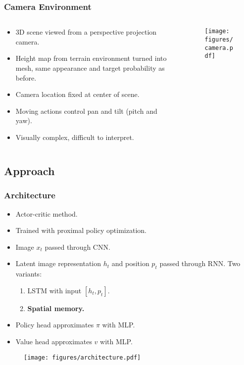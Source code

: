 \begin{frame}
    \frametitle{Camera Environment}
    \begin{columns}
        \begin{column}{0.5\textwidth}
            \begin{itemize}
                \item 3D scene viewed from a perspective projection camera.
                \item Height map from terrain environment turned into mesh, same appearance and target probability as before.
                \item Camera location fixed at center of scene.
                \item Moving actions control pan and tilt (pitch and yaw).
                \item Visually complex, difficult to interpret.
            \end{itemize}
        \end{column}
        \begin{column}{0.5\textwidth}
            \begin{figure}
                \centering
                \texttt{[image: figures/camera.pdf]}
            \end{figure}
        \end{column}
    \end{columns}
\end{frame}

\subsection{Approach}

\begin{frame}
    \frametitle{Architecture}

    \begin{itemize}
        \item Actor-critic method.
        \item Trained with proximal policy optimization.
        \item Image \(x_t\) passed through CNN.
        \item Latent image representation \(h_t\) and position \(p_t\) passed through RNN. Two variants:
        \begin{enumerate}
            \item LSTM with input \(\left\lbrack h_t, p_t \right\rbrack\).
            \item \textbf{Spatial memory.}
        \end{enumerate}
        \item Policy head approximates \(\pi\) with MLP.
        \item Value head approximates \(v\) with MLP.
    \end{itemize}

    \begin{figure}
        \centering
        \texttt{[image: figures/architecture.pdf]}
    \end{figure}
\end{frame}

